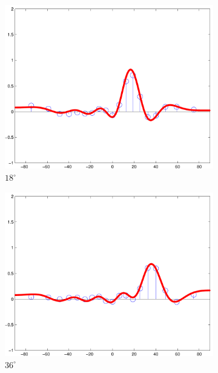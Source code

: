 \documentclass[spanish,openright]{book}
\begin{document}
\begin{figure}
  \begin{subfigure}[b]{0.3\textwidth}
    \includegraphics[width=\textwidth]{Sim_seg025_ang108}
    \caption{$18^{\circ}$}
    \label{fig:Sim_ang108}
  \end{subfigure}
\begin{subfigure}[b]{0.3\textwidth}
    \includegraphics[width=\textwidth]{Sim_seg025_ang126}
    \caption{$36^{\circ}$}
    \label{fig:Sim_ang126}
  \end{subfigure}
\begin{subfigure}[b]{0.3\textwidth}

\end{subfigure}
\end{figure}
\end{document}
